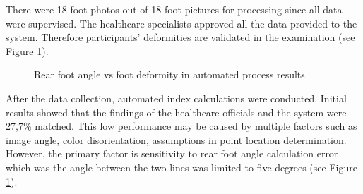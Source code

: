 There were 18 foot photos out of 18 foot pictures for processing since all data were supervised. The healthcare specialists approved all the data provided to the system. Therefore participants' deformities are validated in the examination (see Figure  \ref{fig:StudyIIFootDeformityAutomatedDegreesAndDeformityResults}).

\begin{figure}[htbp]
\centering
{}
\caption{Rear foot angle vs foot deformity in automated process results}
\label{fig:StudyIIFootDeformityAutomatedDegreesAndDeformityResults}
\end{figure} 

After the data collection, automated index calculations were conducted. Initial results showed that the findings of the healthcare officials and the system were 27,7\% matched. This low performance may be caused by multiple factors such as image angle, color disorientation, assumptions in point location determination. However, the primary factor is sensitivity to rear foot angle calculation error which was the angle between the two lines was limited to five degrees (see Figure \ref{fig:StudyIIFootDeformityAutomatedDegreesAndDeformityResults}). 
